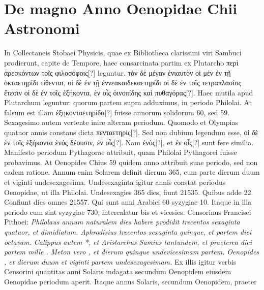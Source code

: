 \section{De magno Anno Oenopidae Chii Astronomi}
%
In Collectaneis Stobaei Physicis, quae ex Bibliotheca clarissimi viri
Sambuci prodierunt, capite de Tempore, haec consarcinata partim
ex Plutarcho \textgreek{περὶ ἀρεσκόντων τοῖς φιλοσόφοις[?]} leguntur.
\textgreek{τὸν δὲ μέγαν ἐνιαυτὸν
οἱ μὲν ἐν τῇ ὀκταετηρίδι τίθενται, οἱ δὲ ἐν τῇ ἐννεακαιδεκαετηρίδι οἱ δὲ ἐν τοῖς
τετραπλασίος ἔτεσιν οἱ δὲ ἐν τοῖς ἑξήκοντα, ἐν οἷς ὀινοπίδης καὶ πυθαγόρας[?]}.
Haec
mutila apud Plutarchum leguntur: quorum partem supra adduximus,
in periodo Philolai.
At falsum est illam \textgreek{ἑξηκονταετηρίδα[?]} fuisse
annorum solidorum 60, sed 59. %
Sexagesimo autem vertente inire
alteram periodum.
Quomodo et Olympias quatuor annis constans
dicta \textgreek{πενταετηρίς[?]}.
Sed non dubium legendum esse, \textgreek{οἱ δὲ ἐν τοῖς ἑξήκοντα
ἑνός δέουσιν, ἐν οἷς[?]}.
Nam \textgreek{ἑνὸς[?]}, et \textgreek{ἐν οἷς[?]} sunt fere similia.
Manifesto periodum
Pythagorae attribuit, quam Philolai Pythagorei fuisse probavimus.
At Oenopides Chius 59 quidem anno attribuit suae periodo,
sed non eadem ratione.
Annum enim Solarem definit dierum 365,
cum parte dierum duum et viginti undesexagesima.
Undesexaginta
igitur annis constat periodus Oenopidae, ut illa Philolai.
Undesexagies 365 dies, fiunt 21535. %
Quibus adde 22.
Confiunt dies
omnes 21557.
Qui sunt anni Arabici 60 syzygiae 10.
Itaque in illa
periodo cum sint syzygiae 730, intercalatur bis et vicesies.
Censorinus
Francisci Pithoei: \textit{Philolaus annum naturalem dies habere prodidit
trecentos sexaginta quatuor, et dimidiatum.}
\textit{Aphrodisius trecentos
sexaginta quinque, et partem diei octavam.}
\textit{Calippus autem
*, %
 et Aristarchus Samius tantundem, et praeterea diei partem
mille .}
\textit{Meton vero , et dierum quinque undevicesimam
partem.}
\textit{Oenopides , et dierum duum et viginti
partem undesexagesimam.}
Ex illis igitur verbis Censorini quantitas
anni Solaris indagata secundum Oenopidem eiusdem Oenopidae periodum
aperit.
Itaque annus Solaris, secundum Oenopidem, praeter
